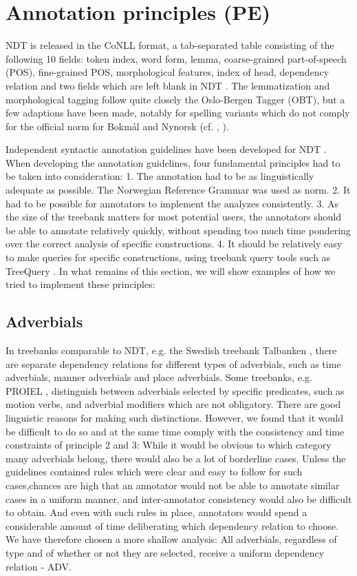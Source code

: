 \documentclass[11pt,a4paper]{article}
\begin{document}

\section{Annotation principles (PE)}
NDT is released in the CoNLL format, a tab-separated table consisting of the following 10 fields: token index, word form, lemma, coarse-grained part-of-speech (POS), fine-grained POS, morphological features, index of head, dependency relation and two fields which are left blank in NDT \cite{Niv:Hal:Kub:07}. The lemmatization and morphological tagging follow quite closely the Oslo-Bergen Tagger (OBT), but a few adaptions have been made, notably for spelling variants which do not comply for the official norm for Bokmål and Nynorsk (cf. \cite{Joh:Hag:No:Lyn:2011}, \cite{Sol:2013}).


Independent syntactic annotation guidelines have been developed for NDT \cite{Kin:Sol:Eri:2013}. When developing the annotation guidelines, four fundamental principles had to be taken into consideration: 1. The annotation had to be as linguistically adequate as possible. The Norwegian Reference Grammar \cite{Faa:Lie:Van:97} was used as norm. 2. It had to be possible for annotators to implement the analyzes consistently. 3. As the size of the treebank matters for most potential users, the annotators should be able to annotate relatively quickly, without spending too much time pondering over the correct analysis of specific constructions. 4. It should be relatively easy to make queries for specific constructions, using treebank query tools such as TreeQuery \cite{Paj:Ste:09}. In what remains of this section, we will show examples of how we tried to implement these principles:

\subsection{Adverbials}
In treebanks comparable to NDT, e.g. the Swedish treebank Talbanken \cite{Niv:Nil:Hal:2006}, there are separate dependency relations for different types of adverbials, such as time adverbials, manner adverbials and place adverbials. Some treebanks, e.g. PROIEL \cite{Hau:Joh:Eck:Wel:Her:Mut:2009}, distinguish between adverbials selected by specific predicates, such as motion verbs, and adverbial modifiers which are not obligatory. There are good linguistic reasons for making such distinctions. However, we found that it would be difficult to do so and at the same time comply with the consistency and time constraints of principle 2 and 3: While it would be obvious to which category many adverbials belong, there would also be a lot of borderline cases. Unless the guidelines contained rules which were clear and easy to follow for such cases,chances are high that an annotator would not be able to annotate similar cases in a uniform manner, and inter-annotator consistency would also be difficult to obtain. And even with such rules in place, annotators would spend a considerable amount of time deliberating which dependency relation to choose. We have therefore chosen a more shallow analysis: All adverbials, regardless of type and of whether or not they are selected, receive a uniform dependency relation - ADV.
\end{document}
